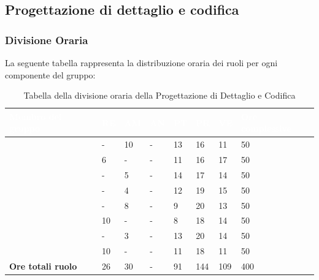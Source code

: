 \subsection{Progettazione di dettaglio e codifica}

\subsubsection{Divisione Oraria}
La seguente tabella rappresenta la distribuzione oraria dei ruoli per ogni componente del gruppo:
{
\renewcommand{\arraystretch}{2}
\begin{longtable}[h!] { C{4cm} C{1cm} C{1cm} C{1cm} C{1cm} C{1cm} C{1cm} C{3cm}}
\caption{Tabella della divisione oraria della Progettazione di Dettaglio e Codifica}\\

\textcolor{white}{\textbf{Membro del gruppo}} & 
\textcolor{white}{\textbf{RE}} & 
\textcolor{white}{\textbf{AM}} & 
\textcolor{white}{\textbf{AN}} & 
\textcolor{white}{\textbf{PT}} & 
\textcolor{white}{\textbf{PR}} & 
\textcolor{white}{\textbf{VE}} & 
\textcolor{white}{\textbf{Ore complessive}}\\
\endhead

\MC{}                     &  - & 10 & - & 13 &  16 &  11 &  50 \\
\LD{}                     &  6 &  - & - & 11 &  16 &  17 &  50 \\
\CE{}                     &  - &  5 & - & 14 &  17 &  14 &  50 \\
\SE{}                     &  - &  4 & - & 12 &  19 &  15 &  50 \\
\PF{}                     &  - &  8 & - &  9 &  20 &  13 &  50 \\
\DF{}                     & 10 &  - & - &  8 &  18 &  14 &  50 \\
\BR{}                     &  - &  3 & - & 13 &  20 &  14 &  50 \\
\AT{}                     & 10 &  - & - & 11 &  18 &  11 &  50 \\
\textbf{Ore totali ruolo} & 26 & 30 & - & 91 & 144 & 109 & 400 \\

\end{longtable}
}

